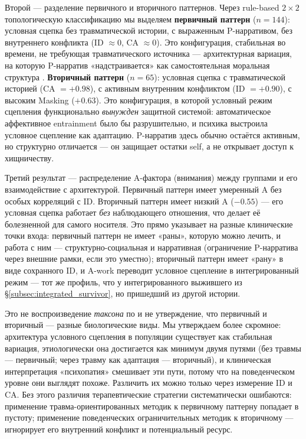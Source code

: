 Второй --- разделение первичного и вторичного паттернов. Через rule-based $2\times 2$ топологическую классификацию мы выделяем \textbf{первичный паттерн} ($n = 144$): условная сцепка без травматической истории, с выраженным P-нарративом, без внутреннего конфликта (ID $\approx 0$, CA $\approx 0$). Это конфигурация, стабильная во времени, не требующая травматического источника --- архитектурная вариация, на которую P-нарратив «надстраивается» как самостоятельная моральная структура \citep[в терминах][эмпирически --- в подобных пропорциях у \citealp{lilienfeld1990, patrick2010}]{karpman1941}. \textbf{Вторичный паттерн} ($n = 65$): условная сцепка с травматической историей (CA $= +0.98$), с активным внутренним конфликтом (ID $= +0.90$), с высоким Masking ($+0.63$). Это конфигурация, в которой условный режим сцепления функционально \emph{вынужден} защитной системой: автоматическое аффективное entrainment было бы разрушительно, и психика выстроила условное сцепление как адаптацию. P-нарратив здесь обычно остаётся активным, но структурно отличается --- он защищает остатки self, а не открывает доступ к хищничеству.

Третий результат --- распределение A-фактора (внимания) между группами и его взаимодействие с архитектурой. Первичный паттерн имеет умеренный A без особых корреляций с ID. Вторичный паттерн имеет низкий A ($-0.55$) --- его условная сцепка работает \emph{без} наблюдающего отношения, что делает её болезненной для самого носителя. Это прямо указывает на разные клинические точки входа: первичный паттерн не имеет «раны», которую можно лечить, и работа с ним --- структурно-социальная и нарративная (ограничение P-нарратива через внешние рамки, если это уместно); вторичный паттерн имеет «рану» в виде сохранного ID, и A-work переводит условное сцепление в интегрированный режим --- тот же профиль, что у интегрированного выжившего из §\ref{subsec:integrated_survivor}, но пришедший из другой истории.

Это не воспроизведение \emph{таксона} по \citet{hare2003} и не утверждение, что первичный и вторичный --- разные биологические виды. Мы утверждаем более скромное: архитектура условного сцепления в популяции существует как стабильная вариация, этиологически она достигается как минимум двумя путями (без травмы --- первичный; через травму как адаптация --- вторичный), и клиническая интерпретация «психопатия» смешивает эти пути, потому что на поведенческом уровне они выглядят похоже. Различить их можно только через измерение ID и CA. Без этого различия терапевтические стратегии систематически ошибаются: применение травма-ориентированных методик к первичному паттерну попадает в пустоту; применение поведенческих ограничительных методик к вторичному --- игнорирует его внутренний конфликт и потенциальный ресурс.

